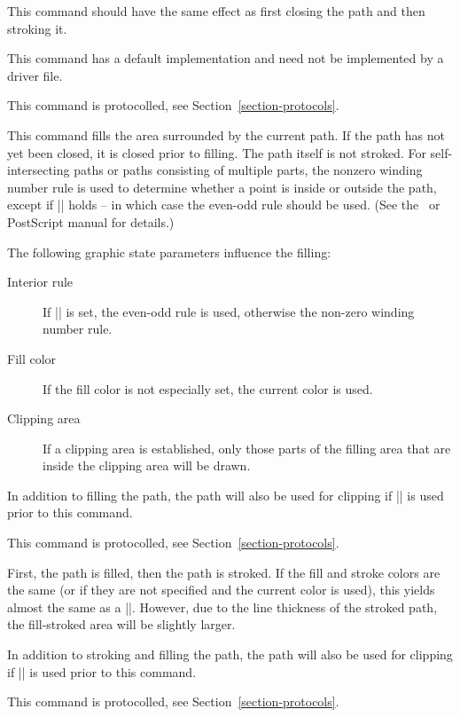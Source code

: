 \begin{command}{\pgfsys@closestroke}
    This command should have the same effect as first closing the path and then
    stroking it.

    This command has a default implementation and need not be implemented by a
    driver file.

    This command is protocolled, see Section~\ref{section-protocols}.
\end{command}


\begin{command}{\pgfsys@fill}
    This command fills the area surrounded by the current path. If the path has
    not yet been closed, it is closed prior to filling. The path itself is not
    stroked. For self-intersecting paths or paths consisting of multiple parts,
    the nonzero winding number rule is used to determine whether a point is
    inside or outside the path, except if |\ifpgfsys@eorule| holds -- in which
    case the even-odd rule should be used. (See the \pdf\ or PostScript manual
    for details.)

    The following graphic state parameters influence the filling:
    \begin{description}
        \item[Interior rule] If |\ifpgfsys@eorule| is set, the even-odd rule is
            used, otherwise the non-zero winding number rule.
        \item[Fill color] If the fill color is not especially set, the current
            color is used.
        \item[Clipping area] If a clipping area is established, only those
            parts of the filling area that are inside the clipping area will be
            drawn.
    \end{description}

    In addition to filling the path, the path will also be used for clipping if
    |\pgfsys@clipnext| is used prior to this command.

    This command is protocolled, see Section~\ref{section-protocols}.
\end{command}

\begin{command}{\pgfsys@fillstroke}
    First, the path is filled, then the path is stroked. If the fill and stroke
    colors are the same (or if they are not specified and the current color is
    used), this yields almost the same as a |\pgfsys@fill|. However, due to the
    line thickness of the stroked path, the fill-stroked area will be slightly
    larger.

    In addition to stroking and filling the path, the path will also be used
    for clipping if |\pgfsys@clipnext| is used prior to this command.

    This command is protocolled, see Section~\ref{section-protocols}.
\end{command}

